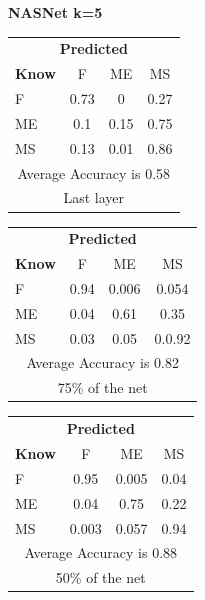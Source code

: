 \documentclass[12pt]{article} %
\begin{document}
\begin{center}
\textbf{NASNet k=5}
\end{center}
\begin{minipage}{0.5\textwidth}
\begin{center}
\begin{tabular}{l|c|c|c|}
 \multicolumn{4}{c}{ \textbf{ Predicted}}\\
 \textbf{Know}&F&ME&MS\\ \hline\hline
F   &0.73&0&0.27\\
ME &0.1&0.15&0.75\\
MS &0.13&0.01&0.86\\
\multicolumn{4}{c}{Average Accuracy is 0.58}\\
\multicolumn{4}{c}{Last layer}\\
\end{tabular}
\end{center}
\end{minipage}
\begin{minipage}{0.5\textwidth}
\begin{center}
\begin{tabular}{l|c|c|c|}
 \multicolumn{4}{c}{ \textbf{ Predicted}}\\
 \textbf{Know}&F&ME&MS\\ \hline\hline
F   &0.94&0.006&0.054\\
ME &0.04&0.61&0.35\\
MS &0.03&0.05&0.0.92\\
\multicolumn{4}{c}{Average Accuracy is 0.82}\\
\multicolumn{4}{c}{75\%  of the net}\\
\end{tabular}
\end{center}
\end{minipage}
\begin{minipage}{0.5\textwidth}
\begin{center}
\begin{tabular}{l|c|c|c|}
 \multicolumn{4}{c}{ \textbf{ Predicted}}\\
 \textbf{Know}&F&ME&MS\\ \hline\hline
F   &0.95&0.005&0.04\\
ME &0.04&0.75&0.22\\
MS &0.003&0.057&0.94\\
\multicolumn{4}{c}{Average Accuracy is 0.88}\\
\multicolumn{4}{c}{50\%  of the net}\\
\end{tabular}
\end{center}
\end{minipage}
\end{document}
